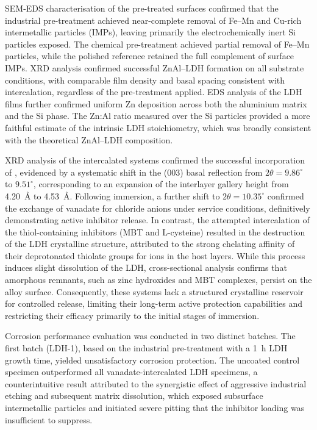 \documentclass[11pt,twoside,a4paper,final]{report}
\begin{document}
SEM-EDS characterisation of the pre-treated surfaces confirmed that the industrial pre-treatment achieved near-complete removal of Fe--Mn and Cu-rich intermetallic particles (IMPs), leaving primarily the electrochemically inert Si particles exposed. The chemical pre-treatment achieved partial removal of Fe--Mn particles, while the polished reference retained the full complement of surface IMPs. XRD analysis confirmed successful ZnAl--LDH formation on all substrate conditions, with comparable film density and basal spacing consistent with  intercalation, regardless of the pre-treatment applied. EDS analysis of the LDH films further confirmed uniform Zn deposition across both the aluminium matrix and the Si phase. The Zn:Al ratio measured over the Si particles provided a more faithful estimate of the intrinsic LDH stoichiometry, which was broadly consistent with the theoretical ZnAl--LDH composition.

XRD analysis of the intercalated systems confirmed the successful incorporation of , evidenced by a systematic shift in the (003) basal reflection from $2\theta = 9.86^\circ$ to $9.51^\circ$, corresponding to an expansion of the interlayer gallery height from \qty{4.20}{\angstrom} to \qty{4.53}{\angstrom}. Following immersion, a further shift to $2\theta = 10.35^\circ$ confirmed the exchange of vanadate for chloride anions under service conditions, definitively demonstrating active inhibitor release. In contrast, the attempted intercalation of the thiol-containing inhibitors (MBT and L-cysteine) resulted in the destruction of the LDH crystalline structure, attributed to the strong chelating affinity of their deprotonated thiolate groups for  ions in the host layers. While this process induces slight dissolution of the LDH, cross-sectional analysis confirms that amorphous remnants, such as zinc hydroxides and MBT complexes, persist on the alloy surface. Consequently, these systems lack a structured crystalline reservoir for controlled release, limiting their long-term active protection capabilities and restricting their efficacy primarily to the initial stages of immersion.

Corrosion performance evaluation was conducted in two distinct batches. The first batch (LDH-1), based on the industrial pre-treatment with a \qty{1}{\hour} LDH growth time, yielded unsatisfactory corrosion protection. The uncoated control specimen outperformed all vanadate-intercalated LDH specimens, a counterintuitive result attributed to the synergistic effect of aggressive industrial etching and subsequent matrix dissolution, which exposed subsurface intermetallic particles and initiated severe pitting that the inhibitor loading was insufficient to suppress. 
\end{document}
